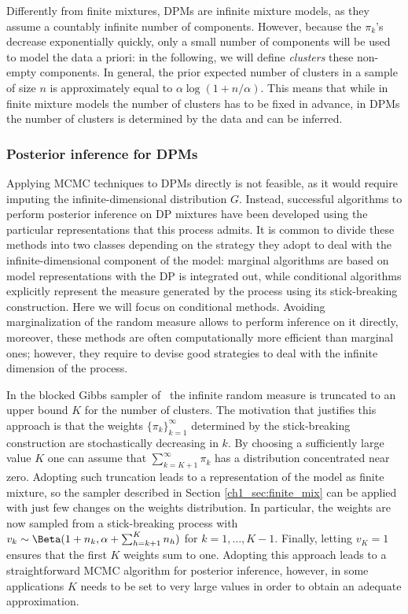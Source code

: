 Differently from finite mixtures, DPMs are infinite mixture models, as they assume a countably infinite number of components. 
However, because the $\pi_k$'s decrease exponentially quickly, only a small number of components will be used to model the
data a priori: in the following, we will define \textit{clusters} these non-empty components. In general, the prior expected number of clusters in a sample of size $n$ is approximately equal to $\alpha \log(1 + n/\alpha)$.
This means that while in finite mixture models the number of clusters has to be fixed in advance, in DPMs the number of clusters is determined by the data and can be inferred.

\subsubsection*{Posterior inference for DPMs}
Applying MCMC techniques to DPMs directly is not feasible, as it would require imputing the infinite-dimensional distribution $G$. Instead, successful algorithms to perform posterior inference on DP mixtures have been developed using the particular representations that this process admits. 
It is common to divide these methods into two classes depending on the strategy they adopt to deal with the infinite-dimensional component of the model: marginal algorithms are based on model representations with the DP is integrated out, while conditional algorithms explicitly represent the measure generated by the process using its stick-breaking construction.
Here we will focus on conditional methods. Avoiding marginalization of the random measure allows to perform inference on it directly, moreover, these methods are often computationally more efficient than marginal ones; however, they require to devise good strategies to deal with the infinite dimension of the process.

In the blocked Gibbs sampler of~\textcite{ishwaran2001} the infinite random measure is truncated to an upper bound $K$ for the number of clusters. The motivation that justifies this approach is that the weights $\{\pi_k\}_{k=1}^{\infty}$ determined by the stick-breaking construction are stochastically decreasing in $k$. By choosing a sufficiently large value $K$ one can assume that $\sum_{k=K+1}^{\infty} \pi_k$ has a distribution concentrated near zero.
Adopting such truncation leads to a representation of the model as finite mixture, so the sampler described in Section \ref{ch1_sec:finite_mix} can be applied with just few changes on the weights distribution. In particular, the weights are now sampled from a stick-breaking process with $v_k \sim \Beta(1+n_k, \alpha + \sum_{h=k+1}^K n_h)$ for $k = 1,\dots,K-1$. Finally, letting $v_K = 1$ ensures that the first $K$ weights sum to one. Adopting this approach leads to a straightforward MCMC algorithm for posterior inference, however, in some applications $K$ needs to be set to very large values in order to obtain an adequate approximation.

